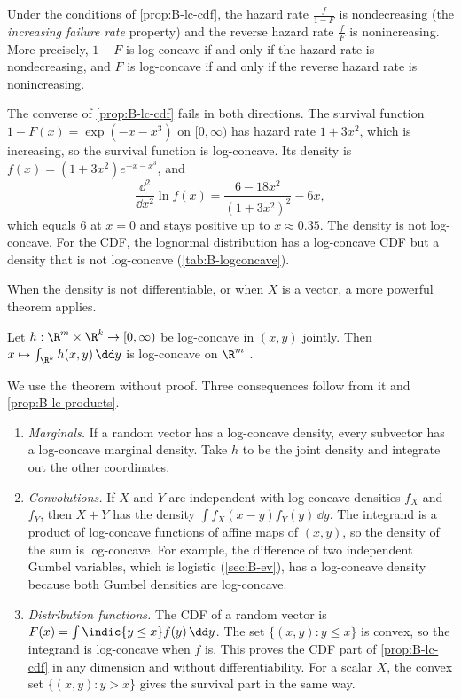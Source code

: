 \begin{corollary}\label{cor:B-hazard}
Under the conditions of \cref{prop:B-lc-cdf}, the hazard rate $\frac{f}{1 - F}$ is nondecreasing (the
\emph{increasing failure rate} property) and the reverse hazard rate $\frac{f}{F}$ is nonincreasing. More
precisely, $1 - F$ is log-concave if and only if the hazard rate is nondecreasing, and $F$ is log-concave if and
only if the reverse hazard rate is nonincreasing.
\end{corollary}

The converse of \cref{prop:B-lc-cdf} fails in both directions. The survival function
$1 - F(x) = \exp(-x - x^3)$ on $[0, \infty)$ has hazard rate $1 + 3x^2$, which is increasing, so the survival
function is log-concave. Its density is $f(x) = (1 + 3x^2)e^{-x - x^3}$, and
\[
  \frac{\dd^2}{\dd x^2}\ln f(x) = \frac{6 - 18x^2}{(1 + 3x^2)^2} - 6x,
\]
which equals $6$ at $x = 0$ and stays positive up to $x \approx 0.35$. The density is not log-concave. For the
CDF, the lognormal distribution has a log-concave CDF but a density that is not log-concave
(\cref{tab:B-logconcave}).

When the density is not differentiable, or when $X$ is a vector, a more powerful theorem applies.

\begin{theorem}[Pr\'ekopa]\label{thm:B-prekopa}
Let $h : \R^m \times \R^k \to [0, \infty)$ be log-concave in $(x, y)$ jointly. Then
$x \mapsto \int_{\R^k} h(x, y)\,\dd y$ is log-concave on $\R^m$ \citep{Prekopa1971}.
\end{theorem}

We use the theorem without proof. Three consequences follow from it and \cref{prop:B-lc-products}.
\begin{enumerate}[label=(\alph*)]
  \item \emph{Marginals.} If a random vector has a log-concave density, every subvector has a log-concave
  marginal density. Take $h$ to be the joint density and integrate out the other coordinates.
  \item \emph{Convolutions.} If $X$ and $Y$ are independent with log-concave densities $f_X$ and $f_Y$, then $X + Y$
  has the density $\int f_X(x - y)f_Y(y)\,\dd y$. The integrand is a product of log-concave functions of affine
  maps of $(x, y)$, so the density of the sum is log-concave. For example, the difference of two independent
  Gumbel variables, which is logistic (\cref{sec:B-ev}), has a log-concave density because both Gumbel
  densities are log-concave.
  \item \emph{Distribution functions.} The CDF of a random vector is $F(x) = \int \indic\{y \leq x\}f(y)\,\dd y$. The
  set $\{(x, y) : y \leq x\}$ is convex, so the integrand is log-concave when $f$ is. This proves the CDF part of
  \cref{prop:B-lc-cdf} in any dimension and without differentiability. For a scalar $X$, the convex set
  $\{(x, y) : y > x\}$ gives the survival part in the same way.
\end{enumerate}

